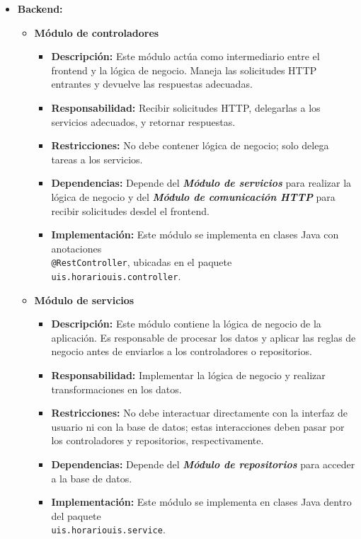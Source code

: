 \documentclass{article} %
\begin{document}
\begin{itemize}
        \item \textbf{Backend:} 
        \begin{itemize}
            \item \textbf{Módulo de controladores}
            \begin{itemize}
                \item \textbf{Descripción:} Este módulo actúa como intermediario entre el frontend y la lógica de negocio. Maneja las solicitudes HTTP entrantes y devuelve las respuestas adecuadas.
                \item \textbf{Responsabilidad:} Recibir solicitudes HTTP, delegarlas a los servicios adecuados, y retornar respuestas.
                \item \textbf{Restricciones:} No debe contener lógica de negocio; solo delega tareas a los servicios.
                \item \textbf{Dependencias:} Depende del \textbf{\emph{Módulo de servicios}} para realizar la lógica de negocio y del \textbf{\textit{Módulo de comunicación HTTP}} para recibir solicitudes desdel el frontend.
                \item \textbf{Implementación:} Este módulo se implementa en clases Java con anotaciones \\\texttt{@RestController}, ubicadas en el paquete \texttt{uis.horariouis.controller}.
            \end{itemize}
            
            \item \textbf{Módulo de servicios}
            \begin{itemize}
                \item \textbf{Descripción:} Este módulo contiene la lógica de negocio de la aplicación. Es responsable de procesar los datos y aplicar las reglas de negocio antes de enviarlos a los controladores o repositorios.
                \item \textbf{Responsabilidad:} Implementar la lógica de negocio y realizar transformaciones en los datos.
                \item \textbf{Restricciones:} No debe interactuar directamente con la interfaz de usuario ni con la base de datos; estas interacciones deben pasar por los controladores y repositorios, respectivamente.
                \item \textbf{Dependencias:} Depende del \textbf{\emph{Módulo de repositorios}} para acceder a la base de datos.
                \item \textbf{Implementación:} Este módulo se implementa en clases Java dentro del paquete \\\texttt{uis.horariouis.service}.
            \end{itemize}
            

\end{itemize}
\end{itemize}
\end{document}
